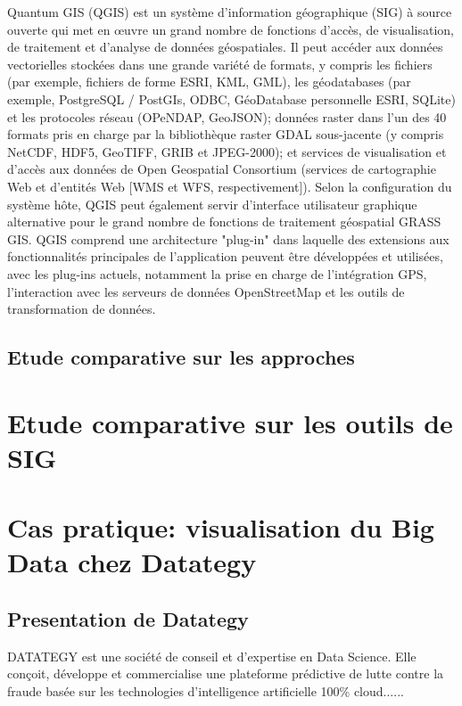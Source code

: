 \documentclass[french, a4paper, 12pt]{report}
\begin{document}
Quantum GIS (QGIS) est un système d’information géographique (SIG) à source ouverte qui met en œuvre un grand nombre de fonctions d’accès, de visualisation, de traitement et d’analyse de données géospatiales. Il peut accéder aux données vectorielles stockées dans une grande variété de formats, y compris les fichiers (par exemple, fichiers de forme ESRI, KML, GML), les géodatabases (par exemple, PostgreSQL / PostGIs, ODBC, GéoDatabase personnelle ESRI, SQLite) et les protocoles réseau (OPeNDAP, GeoJSON); données raster dans l'un des 40 formats pris en charge par la bibliothèque raster GDAL sous-jacente (y compris NetCDF, HDF5, GeoTIFF, GRIB et JPEG-2000); et services de visualisation et d'accès aux données de Open Geospatial Consortium (services de cartographie Web et d'entités Web [WMS et WFS, respectivement]). Selon la configuration du système hôte, QGIS peut également servir d’interface utilisateur graphique alternative pour le grand nombre de fonctions de traitement géospatial GRASS GIS. QGIS comprend une architecture "plug-in" dans laquelle des extensions aux fonctionnalités principales de l'application peuvent être développées et utilisées, avec les plug-ins actuels, notamment la prise en charge de l'intégration GPS, l'interaction avec les serveurs de données OpenStreetMap et les outils de transformation de données.


\section{Etude comparative sur les approches }
















\chapter{ Etude comparative sur les outils de SIG }

\chapter{Cas pratique: visualisation du Big Data chez Datategy}
\section{Presentation de Datategy}
DATATEGY est une société de conseil et d’expertise en Data Science. Elle conçoit, développe et commercialise une plateforme prédictive de lutte contre la fraude basée sur les technologies d’intelligence artificielle 100\% cloud......
\end{document}

